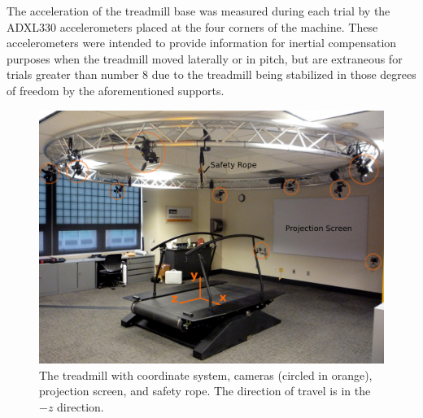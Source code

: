 \documentclass[fleqn,12pt]{wlpeerj}
\begin{document}
The acceleration of the treadmill base was measured during each trial by the
ADXL330 accelerometers placed at the four corners of the machine. These
accelerometers were intended to provide information for inertial compensation
purposes when the treadmill moved laterally or in pitch, but are extraneous for
trials greater than number 8 due to the treadmill being stabilized in those
degrees of freedom by the aforementioned supports.
%
\begin{figure}
  \centering
  \includegraphics{figures/treadmill.png}
  \caption{The treadmill with coordinate system, cameras (circled in orange),
    projection screen, and safety rope. The direction of travel is in the $-z$
    direction.}
  \label{fig:treadmill}
\end{figure}
\end{document}
